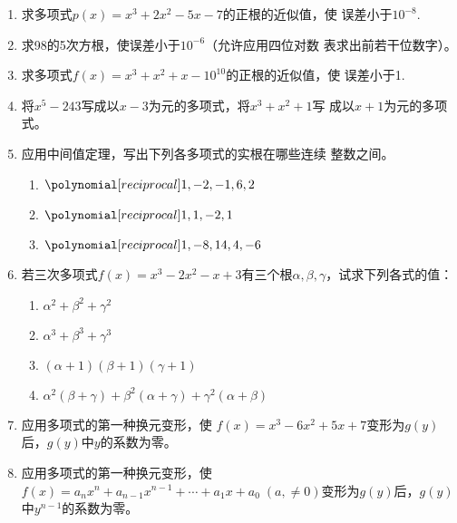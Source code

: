 \begin{enumerate}
\item 求多项式$p(x)=x^3+2x^2-5x-7$的正根的近似值，使
误差小于$10^{-8}$.

\item 求98的5次方根，使误差小于$10^{-6}$（允许应用四位对数
表求出前若干位数字）。

\item 求多项式$f(x)=x^3+x^2+x-10^{10}$的正根的近似值，使
误差小于1.

\item 将$x^5-243$写成以$x-3$为元的多项式，将$x^3+x^2+1$写
成以$x+1$为元的多项式。

\item 应用中间值定理，写出下列各多项式的实根在哪些连续
整数之间。
\begin{enumerate}
    \item $\poly{1,-2,-1,6,2}$
    \item $\poly{1,1,-2,1}$
    \item $\poly{1,-8,14,4,-6}$
\end{enumerate}

\item 若三次多项式$f(x)=x^3-2x^2-x+3$有三个根$\alpha,\beta,\gamma$，试求下列各式的值：
\begin{enumerate}
    \item $\alpha^2+\beta^2+\gamma^2$
    \item $\alpha^3+\beta^3+\gamma^3$
    \item $(\alpha+1)(\beta+1)(\gamma+1)$
    \item $\alpha^2(\beta+\gamma)+\beta^2(\alpha+\gamma)+\gamma^2(\alpha+\beta)$
\end{enumerate}


\item 应用多项式的第一种换元变形，使
$f (x) =x^3-6x^2+5x+7$变形为$g(y)$后，$g(y)$中$y$的系数为零。
\item 应用多项式的第一种换元变形，使
$f (x) =a_nx^n+a_{n-1}x^{n-1}+\cdots +a_1x+a_0\;  (a, \ne 0)$变形为$g(y)$后，$g(y)$中$y^{n-1}$的系数为零。


\end{enumerate}
